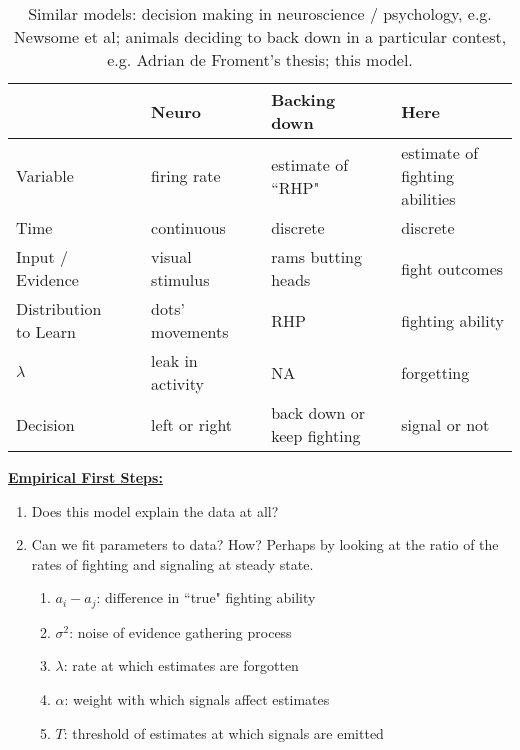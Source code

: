 \documentclass{article}
\begin{document}
\begin{table}[h] 
	\caption{\label{matrices} Similar models: decision making in neuroscience / psychology, e.g. Newsome et al; animals deciding to back down in a particular contest, e.g. Adrian de Froment's thesis; this model.}
		\begin{tabular}{lllllll} 
			& \vline & Neuro  & \vline & Backing down  & \vline & Here \\
			\hline 
			Variable & \vline & firing rate & \vline & estimate of ``RHP" & \vline & estimate of fighting abilities
			\\Time & \vline & continuous & \vline & discrete & \vline & discrete
			\\Input / Evidence & \vline & visual stimulus & \vline & rams butting heads & \vline & fight outcomes
			\\ Distribution to Learn & \vline & dots' movements & \vline & RHP & \vline & fighting ability
			\\ $\lambda$ & \vline & leak in activity & \vline &  NA & \vline &  forgetting 
			\\ Decision & \vline & left or right & \vline & back down or keep fighting & \vline & signal or not
			\end{tabular}
\end{table}



\underline{\bf Empirical First Steps:}
\begin{enumerate}
\item{Does this model explain the data at all?}
\item{Can we fit parameters to data?  How?  Perhaps by looking at the ratio of the rates of fighting and signaling at steady state.
\begin{enumerate}
\item{$a_i-a_j$: difference in ``true" fighting ability}
\item{$\sigma^2$: noise of evidence gathering process}
\item{$\lambda$: rate at which estimates are forgotten}
\item{$\alpha$: weight with which signals affect estimates}
\item{$T$: threshold of estimates at which signals are emitted}
\end{enumerate}
}
\end{enumerate}
\end{document}

